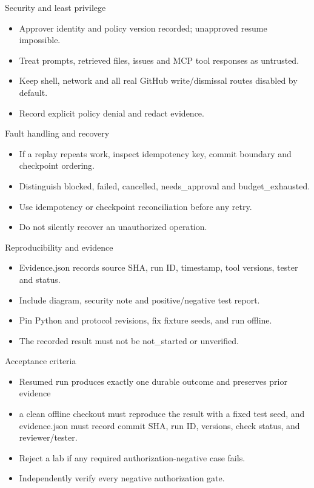 \documentclass[aspectratio=169,10pt]{beamer}
\begin{document}
\begin{frame}{Security and least privilege}
\small
\begin{itemize}
\item Approver identity and policy version recorded; unapproved resume impossible.
\item Treat prompts, retrieved files, issues and MCP tool responses as untrusted.
\item Keep shell, network and all real GitHub write/dismissal routes disabled by default.
\item Record explicit policy denial and redact evidence.
\end{itemize}

\end{frame}

\begin{frame}{Fault handling and recovery}
\small
\begin{itemize}
\item If a replay repeats work, inspect idempotency key, commit boundary and checkpoint ordering.
\item Distinguish blocked, failed, cancelled, needs\_approval and budget\_exhausted.
\item Use idempotency or checkpoint reconciliation before any retry.
\item Do not silently recover an unauthorized operation.
\end{itemize}

\end{frame}

\begin{frame}{Reproducibility and evidence}
\small
\begin{itemize}
\item Evidence.json records source SHA, run ID, timestamp, tool versions, tester and status.
\item Include diagram, security note and positive/negative test report.
\item Pin Python and protocol revisions, fix fixture seeds, and run offline.
\item The recorded result must not be not\_started or unverified.
\end{itemize}

\end{frame}

\begin{frame}{Acceptance criteria}
\small
\begin{itemize}
\item Resumed run produces exactly one durable outcome and preserves prior evidence
\item a clean offline checkout must reproduce the result with a fixed test seed, and evidence.json must record commit SHA, run ID, versions, check status, and reviewer/tester.
\item Reject a lab if any required authorization-negative case fails.
\item Independently verify every negative authorization gate.
\end{itemize}

\end{frame}
\end{document}
